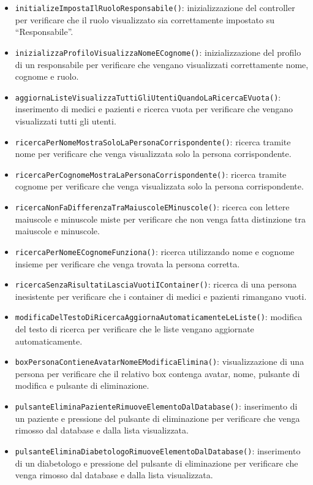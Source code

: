 \begin{itemize}
	
	\item \texttt{initializeImpostaIlRuoloResponsabile()}: inizializzazione del controller per verificare che il ruolo visualizzato sia correttamente impostato su ``Responsabile''.
	
	\item \texttt{inizializzaProfiloVisualizzaNomeECognome()}: inizializzazione del profilo di un responsabile per verificare che vengano visualizzati correttamente nome, cognome e ruolo.
	
	\item \texttt{aggiornaListeVisualizzaTuttiGliUtentiQuandoLaRicercaEVuota()}: inserimento di medici e pazienti e ricerca vuota per verificare che vengano visualizzati tutti gli utenti.
	
	\item \texttt{ricercaPerNomeMostraSoloLaPersonaCorrispondente()}: ricerca tramite nome per verificare che venga visualizzata solo la persona corrispondente.
	
	\item \texttt{ricercaPerCognomeMostraLaPersonaCorrispondente()}: ricerca tramite cognome per verificare che venga visualizzata solo la persona corrispondente.
	
	\item \texttt{ricercaNonFaDifferenzaTraMaiuscoleEMinuscole()}: ricerca con lettere maiuscole e minuscole miste per verificare che non venga fatta distinzione tra maiuscole e minuscole.
	
	\item \texttt{ricercaPerNomeECognomeFunziona()}: ricerca utilizzando nome e cognome insieme per verificare che venga trovata la persona corretta.
	
	\item \texttt{ricercaSenzaRisultatiLasciaVuotiIContainer()}: ricerca di una persona inesistente per verificare che i container di medici e pazienti rimangano vuoti.
	
	\item \texttt{modificaDelTestoDiRicercaAggiornaAutomaticamenteLeListe()}: modifica del testo di ricerca per verificare che le liste vengano aggiornate automaticamente.
	
	\item \texttt{boxPersonaContieneAvatarNomeEModificaElimina()}: visualizzazione di una persona per verificare che il relativo box contenga avatar, nome, pulsante di modifica e pulsante di eliminazione.
	
	\item \texttt{pulsanteEliminaPazienteRimuoveElementoDalDatabase()}: inserimento di un paziente e pressione del pulsante di eliminazione per verificare che venga rimosso dal database e dalla lista visualizzata.
	
	\item \texttt{pulsanteEliminaDiabetologoRimuoveElementoDalDatabase()}: inserimento di un diabetologo e pressione del pulsante di eliminazione per verificare che venga rimosso dal database e dalla lista visualizzata.
	
\end{itemize}

